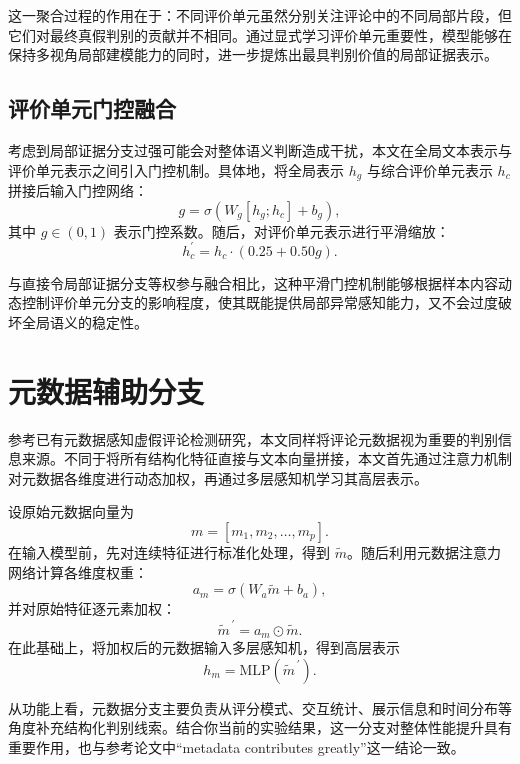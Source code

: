 \documentclass[UTF8,oneside,openright,fontset=none]{ctexbook}
\numberwithin{equation}{chapter}
\begin{document}
这一聚合过程的作用在于：不同评价单元虽然分别关注评论中的不同局部片段，但它们对最终真假判别的贡献并不相同。通过显式学习评价单元重要性，模型能够在保持多视角局部建模能力的同时，进一步提炼出最具判别价值的局部证据表示。

\subsection{评价单元门控融合}

考虑到局部证据分支过强可能会对整体语义判断造成干扰，本文在全局文本表示与评价单元表示之间引入门控机制。具体地，将全局表示 $h_g$ 与综合评价单元表示 $h_c$ 拼接后输入门控网络：
\begin{equation}
  g = \sigma(W_g[h_g;h_c]+b_g),
\end{equation}
其中 $g \in (0,1)$ 表示门控系数。随后，对评价单元表示进行平滑缩放：
\begin{equation}
  h_c^{\prime} = h_c \cdot (0.25 + 0.50g).
\end{equation}

与直接令局部证据分支等权参与融合相比，这种平滑门控机制能够根据样本内容动态控制评价单元分支的影响程度，使其既能提供局部异常感知能力，又不会过度破坏全局语义的稳定性。

\section{元数据辅助分支}

参考已有元数据感知虚假评论检测研究，本文同样将评论元数据视为重要的判别信息来源。不同于将所有结构化特征直接与文本向量拼接，本文首先通过注意力机制对元数据各维度进行动态加权，再通过多层感知机学习其高层表示。

设原始元数据向量为
\begin{equation}
  m=[m_1,m_2,\ldots,m_p].
\end{equation}
在输入模型前，先对连续特征进行标准化处理，得到 $\tilde{m}$。随后利用元数据注意力网络计算各维度权重：
\begin{equation}
  a_m = \sigma(W_a \tilde{m} + b_a),
\end{equation}
并对原始特征逐元素加权：
\begin{equation}
  \tilde{m}^{\,\prime} = a_m \odot \tilde{m}.
\end{equation}
在此基础上，将加权后的元数据输入多层感知机，得到高层表示
\begin{equation}
  h_m = \mathrm{MLP}(\tilde{m}^{\,\prime}).
\end{equation}

从功能上看，元数据分支主要负责从评分模式、交互统计、展示信息和时间分布等角度补充结构化判别线索。结合你当前的实验结果，这一分支对整体性能提升具有重要作用，也与参考论文中“metadata contributes greatly”这一结论一致。
\end{document}
